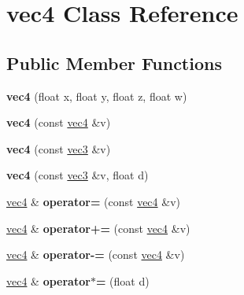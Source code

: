 \hypertarget{classvec4}{\section{vec4 Class Reference}
\label{classvec4}
}
\subsection*{Public Member Functions}
\begin{DoxyCompactItemize}
\item 
\hypertarget{classvec4_a4174b718621ba5b473ea2c289f11fe46}{{\bfseries vec4} (float x, float y, float z, float w)}\label{classvec4_a4174b718621ba5b473ea2c289f11fe46}

\item 
\hypertarget{classvec4_acccb915903f97605879d62049357c2b4}{{\bfseries vec4} (const \hyperlink{classvec4}{vec4} \&v)}\label{classvec4_acccb915903f97605879d62049357c2b4}

\item 
\hypertarget{classvec4_a977090532e2baca5d9b0affd029fab7d}{{\bfseries vec4} (const \hyperlink{classvec3}{vec3} \&v)}\label{classvec4_a977090532e2baca5d9b0affd029fab7d}

\item 
\hypertarget{classvec4_a38decce62d3631caf397b90078a39d64}{{\bfseries vec4} (const \hyperlink{classvec3}{vec3} \&v, float d)}\label{classvec4_a38decce62d3631caf397b90078a39d64}

\item 
\hypertarget{classvec4_aed2a473c8d724973efb4ede93a2a5e95}{\hyperlink{classvec4}{vec4} \& {\bfseries operator=} (const \hyperlink{classvec4}{vec4} \&v)}\label{classvec4_aed2a473c8d724973efb4ede93a2a5e95}

\item 
\hypertarget{classvec4_a16d10f2ed44304fb1309f959f245ca52}{\hyperlink{classvec4}{vec4} \& {\bfseries operator+=} (const \hyperlink{classvec4}{vec4} \&v)}\label{classvec4_a16d10f2ed44304fb1309f959f245ca52}

\item 
\hypertarget{classvec4_a88f2ead88470beaa5204573d3862166e}{\hyperlink{classvec4}{vec4} \& {\bfseries operator-\/=} (const \hyperlink{classvec4}{vec4} \&v)}\label{classvec4_a88f2ead88470beaa5204573d3862166e}

\item 
\hypertarget{classvec4_a43918272bd61e5f8057de4a1ec0bd254}{\hyperlink{classvec4}{vec4} \& {\bfseries operator$\ast$=} (float d)}\label{classvec4_a43918272bd61e5f8057de4a1ec0bd254}


\end{DoxyCompactItemize}
